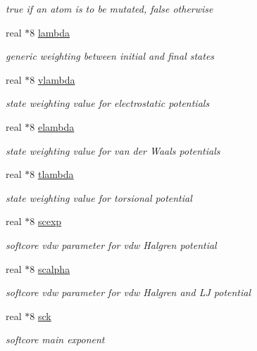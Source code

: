 \begin{DoxyCompactItemize}
\begin{DoxyCompactList}\small\item\em true if an atom is to be mutated, false otherwise \end{DoxyCompactList}\item 
real $\ast$8 \hyperlink{classmutant_adee687e0840c070a419397c427a8af9a}{lambda}
\begin{DoxyCompactList}\small\item\em generic weighting between initial and final states \end{DoxyCompactList}\item 
real $\ast$8 \hyperlink{classmutant_a36e3043de18b146a6010b9a3fbf02136}{vlambda}
\begin{DoxyCompactList}\small\item\em state weighting value for electrostatic potentials \end{DoxyCompactList}\item 
real $\ast$8 \hyperlink{classmutant_a2ff148e7bea3c2bd798ac5b5d1b82077}{elambda}
\begin{DoxyCompactList}\small\item\em state weighting value for van der Waals potentials \end{DoxyCompactList}\item 
real $\ast$8 \hyperlink{classmutant_ad09b1660ee7cf2b19032e29646050709}{tlambda}
\begin{DoxyCompactList}\small\item\em state weighting value for torsional potential \end{DoxyCompactList}\item 
real $\ast$8 \hyperlink{classmutant_abfb067bfd2af142a9515f2cc61fc35b1}{scexp}
\begin{DoxyCompactList}\small\item\em softcore vdw parameter for vdw Halgren potential \end{DoxyCompactList}\item 
real $\ast$8 \hyperlink{classmutant_abad0ffe3a5429d56f8ea16467ad1268d}{scalpha}
\begin{DoxyCompactList}\small\item\em softcore vdw parameter for vdw Halgren and L\-J potential \end{DoxyCompactList}\item 
real $\ast$8 \hyperlink{classmutant_ac9c6937ee255a5b25c9faa8d1ba4467e}{sck}
\begin{DoxyCompactList}\small\item\em softcore main exponent \end{DoxyCompactList}\item 

\end{DoxyCompactItemize}
